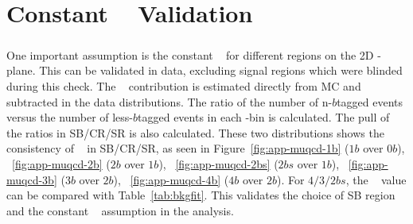 \chapter{Constant \muqcd~ Validation}
\label{AppendixMuqcd}

\paragraph{}
One important assumption is the constant \muqcd~ for different regions on the 2D \mleadJ-\msublJ plane. 
This can be validated in data, excluding signal regions which were blinded during this check. 
The \ttbar~ contribution is estimated directly from MC and subtracted in the data distributions. 
The ratio of the number of n-$b$tagged events versus the number of less-$b$tagged events in each \mleadJ-\msublJ bin is calculated.
The pull of the ratios in SB/CR/SR is also calculated.
These two distributions shows the consistency of \muqcd~ in SB/CR/SR, as seen in Figure~\ref{fig:app-muqcd-1b} ($1b$ over $0b$), ~\ref{fig:app-muqcd-2b} ($2b$ over $1b$), ~\ref{fig:app-muqcd-2bs} ($2bs$ over $1b$), ~\ref{fig:app-muqcd-3b} ($3b$ over $2b$), ~\ref{fig:app-muqcd-4b} ($4b$ over $2b$). For $4/3/2bs$, the \muqcd~ value can be compared with Table~\ref{tab:bkgfit}. 
This validates the choice of SB region and the constant \muqcd~ assumption in the analysis.


